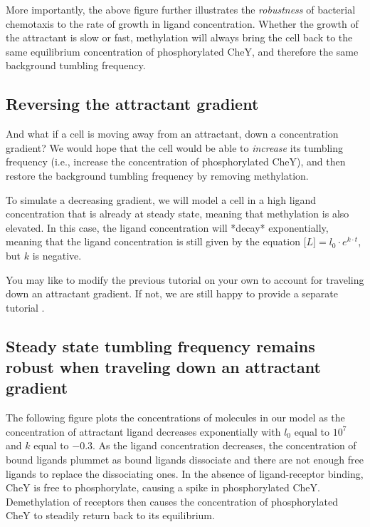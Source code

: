 More importantly, the above figure further illustrates the \textit{robustness} of bacterial chemotaxis to the rate of growth in ligand concentration. Whether the growth of the attractant is slow or fast, methylation will always bring the cell back to the same equilibrium concentration of phosphorylated CheY, and therefore the same background tumbling frequency.

\FloatBarrier
{}
\subsection{Reversing the attractant gradient}

And what if a cell is moving away from an attractant, down a concentration gradient? We would hope that the cell would be able to \textit{increase} its tumbling frequency (i.e., increase the concentration of phosphorylated CheY), and then restore the background tumbling frequency by removing methylation.

To simulate a decreasing gradient, we will model a cell in a high ligand concentration that is already at steady state, meaning that methylation is also elevated. In this case, the ligand concentration will *decay* exponentially, meaning that the ligand concentration is still given by the equation $\text{[}L{]} = l_0 \cdot e^{k \cdot t}$, but $k$ is negative.

\begin{qbox}\end{qbox}

You may like to modify the previous tutorial on your own to account for traveling down an attractant gradient. If not, we are still happy to provide a separate tutorial .


\FloatBarrier
{}
\subsection{Steady state tumbling frequency remains robust when traveling down an attractant gradient}

The following figure plots the concentrations of molecules in our model as the concentration of attractant ligand decreases exponentially with $l_0$ equal to $10^7$ and $k$ equal to $-0.3$. As the ligand concentration decreases, the concentration of bound ligands plummet as bound ligands dissociate and there are not enough free ligands to replace the dissociating ones. In the absence of ligand-receptor binding, CheY is free to phosphorylate, causing a spike in phosphorylated CheY. Demethylation of receptors then causes the concentration of phosphorylated CheY to steadily return back to its equilibrium.


